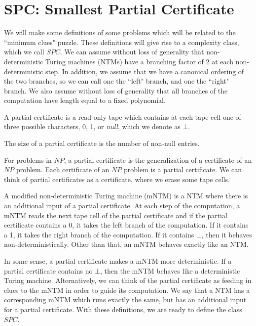 \documentclass[runningheads,a4paper]{llncs}
\begin{document}
\section{SPC: Smallest Partial Certificate}
\label{sec:SPC}

We will make some definitions of some problems which will be related to the ``minimum clues" puzzle. These definitions will give rise to a complexity class, which we call  $SPC$. We can assume without loss of generality that non-deterministic Turing machines (NTMs) have a branching factor of $2$ at each non-deterministic step. In addition, we assume that we have a canonical ordering of the two branches, so we can call one the ``left" branch, and one the ``right" branch. We also assume without loss of generality that all branches of the computation have length equal to a fixed polynomial.

\begin{definition}
A partial certificate is a read-only tape which contains at each tape cell one of three possible characters, 0, 1, or \emph{null}, which we denote as $\bot$.
\end{definition}

\begin{definition}
The size of a partial certificate is the number of non-null entries. 
\end{definition}

For problems in $NP$, a partial certificate is the generalization of a certificate of an $NP$ problem. Each certificate of an $NP$ problem is a partial certificate. We can think of partial certificates as a certificate, where we erase some tape cells.

\begin{definition}
A modified non-deterministic Turing machine (mNTM) is a NTM where there is an additional input of a partial certificate. At each step of the computation, a mNTM reads the next tape cell of the partial certificate and if the partial certificate contains a 0, it takes the left branch of the computation. If it contains a 1, it takes the right branch of the computation. If it contains $\bot$, then it behaves non-deterministically. Other than that, an mNTM behaves exactly like an NTM.
\end{definition}

In some sense, a partial certificate makes a mNTM more deterministic. If a partial certificate contains no $\bot$, then the mNTM behaves like a deterministic Turing machine. Alternatively, we can think of the partial certificate as feeding in clues to the mNTM in order to guide its computation. We say that a NTM has a corresponding mNTM which runs exactly the same, but has an additional input for a partial certificate. With these definitions, we are ready to define the class $SPC$.
\end{document}
